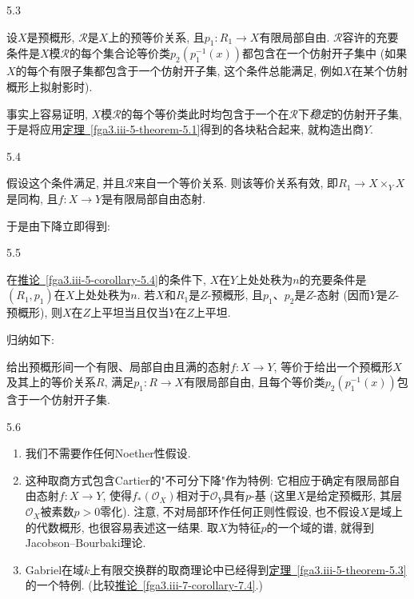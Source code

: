 \begin{theorem}{5.3}\label{fga3.iii-5-theorem-5.3}\skipsinglepar
\par{}设\(X\)是预概形, \(\mathcal {R}\)是\(X\)上的预等价关系, 且\(p_1\colon  R_1\to  X\)有限局部自由. \(\mathcal {R}\)容许的充要条件是\(X\)模\(\mathcal {R}\)的每个集合论等价类\(p_2(p_1^{-1}(x))\)都包含在一个仿射开子集中 (如果\(X\)的每个有限子集都包含于一个仿射开子集, 这个条件总能满足, 例如\(X\)在某个仿射概形上拟射影时).
\end{theorem}
\par{}事实上容易证明, \(X\)模\(\mathcal {R}\)的每个等价类此时均包含于一个在\(\mathcal {R}\)下\emph{稳定}的仿射开子集, 于是将应用\hyperref[fga3.iii-5-theorem-5.1]{定理~\ref*{fga3.iii-5-theorem-5.1}}得到的各块粘合起来, 就构造出商\(Y\).
\begin{corollary}{5.4}\label{fga3.iii-5-corollary-5.4}\skipsinglepar
\par{}假设这个条件满足, 并且\(\mathcal {R}\)来自一个等价关系. 则该等价关系有效, 即\(R_1\to  X\times _Y X\)是同构, 且\(f\colon  X\to  Y\)是有限局部自由态射.
\end{corollary}
\par{}于是由下降立即得到:
\begin{corollary}{5.5}\label{fga3.iii-5-corollary-5.5}\skipsinglepar
\par{}在\hyperref[fga3.iii-5-corollary-5.4]{推论~\ref*{fga3.iii-5-corollary-5.4}}的条件下, \(X\)在\(Y\)上处处秩为\(n\)的充要条件是\((R_1,p_1)\)在\(X\)上处处秩为\(n\). 若\(X\)和\(R_1\)是\(Z\)-预概形, 且\(p_1\)、\(p_2\)是\(Z\)-态射 (因而\(Y\)是\(Z\)-预概形), 则\(X\)在\(Z\)上平坦当且仅当\(Y\)在\(Z\)上平坦.
\end{corollary}
\par{}归纳如下:
\begin{scholium}{}\label{fga3.iii-5-scholium}\skipsinglepar
\par{}给出预概形间一个有限、局部自由且满的态射\(f\colon  X\to  Y\), 等价于给出一个预概形\(X\)及其上的等价关系\(R\), 满足\(p_1\colon  R\to  X\)有限局部自由, 且每个等价类\(p_2(p_1^{-1}(x))\)包含于一个仿射开子集.
\end{scholium}
\begin{remarks}{5.6}\label{fga3.iii-5-remarks-5.6}\skipsinglepar
\begin{enumerate}\item{}我们不需要作任何Noether性假设.

    \item{}这种取商方式包含Cartier的"不可分下降"作为特例: 它相应于确定有限局部自由态射\(f\colon  X\to  Y\), 使得\(f_*(\mathcal {O}_X)\)相对于\(\mathcal {O}_Y\)具有\(p\)-基 (这里\(X\)是给定预概形, 其层\(\mathcal {O}_X\)被素数\(p>0\)零化). 注意, 不对局部环作任何正则性假设, 也不假设\(X\)是域上的代数概形, 也很容易表述这一结果. 取\(X\)为特征\(p\)的一个域的谱, 就得到Jacobson–Bourbaki理论.

    \item{}Gabriel在域\(k\)上有限交换群的取商理论中已经得到\hyperref[fga3.iii-5-theorem-5.3]{定理~\ref*{fga3.iii-5-theorem-5.3}}的一个特例. (比较\hyperref[fga3.iii-7-corollary-7.4]{推论~\ref*{fga3.iii-7-corollary-7.4}}.)
\end{enumerate}
\end{remarks}

